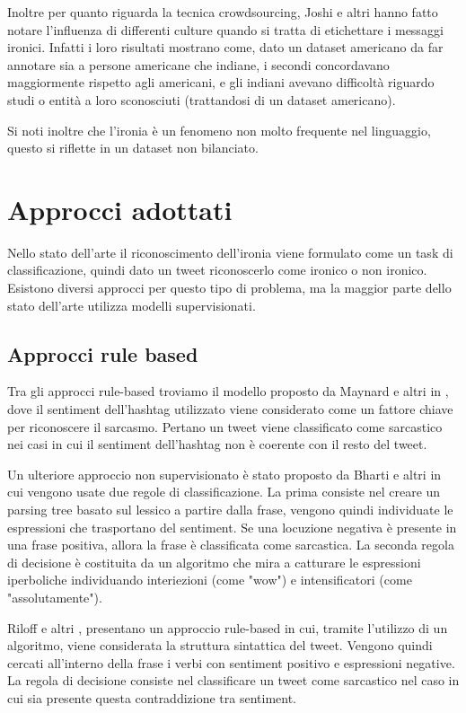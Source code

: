 \documentclass[oneside]{book}
\begin{document}
Inoltre per quanto riguarda la tecnica crowdsourcing, Joshi e altri \cite{survey5} hanno fatto notare l'influenza di differenti culture quando si tratta di etichettare i messaggi ironici. Infatti i loro risultati mostrano come, dato un dataset americano da far annotare sia a persone americane che indiane, i secondi concordavano maggiormente rispetto agli americani, e gli indiani avevano difficoltà riguardo studi o entità a loro sconosciuti (trattandosi di un dataset americano).

Si noti inoltre che l'ironia è un fenomeno non molto frequente nel linguaggio, questo si riflette in un dataset non bilanciato.


\section{Approcci adottati}
Nello stato dell'arte il riconoscimento dell'ironia viene formulato come un task di classificazione, quindi dato un tweet riconoscerlo come ironico o non ironico. Esistono  diversi approcci per questo tipo di problema, ma la maggior parte dello stato dell'arte utilizza modelli supervisionati.

\subsection{Approcci rule based}
Tra gli approcci rule-based troviamo il modello proposto da Maynard e altri in \cite{hashtag}, dove il sentiment dell'hashtag utilizzato viene considerato come un fattore chiave per riconoscere il sarcasmo. Pertano un tweet viene classificato come sarcastico nei casi in cui il sentiment dell'hashtag non è coerente con il resto del tweet.

Un ulteriore approccio non supervisionato è stato proposto da Bharti e altri \cite{parsing-tree} in cui vengono usate due regole di classificazione. La prima consiste nel creare un parsing tree basato sul lessico a partire dalla frase, vengono quindi individuate le espressioni che trasportano del sentiment. Se una locuzione negativa è presente in una frase positiva, allora la frase è classificata come sarcastica. La seconda regola di decisione è costituita da un algoritmo che mira a catturare le espressioni iperboliche individuando interiezioni (come "wow") e intensificatori (come "assolutamente").

Riloff e altri \cite{rilof}, presentano un approccio rule-based in cui, tramite l'utilizzo di un algoritmo, viene considerata la struttura sintattica del tweet. Vengono quindi cercati all'interno della frase i verbi con sentiment positivo e espressioni negative. La regola di decisione consiste nel classificare un tweet come sarcastico nel caso in cui sia presente questa contraddizione tra sentiment.
\end{document}
